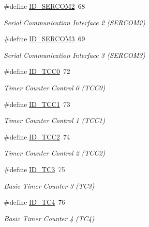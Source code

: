 \begin{DoxyCompactItemize}
\#define \mbox{\hyperlink{group___s_a_m_d21_e15_b__id_ga686cda24424f0437fd3fd9a949c81314}{I\+D\+\_\+\+S\+E\+R\+C\+O\+M2}}~68
\begin{DoxyCompactList}\small\item\em Serial Communication Interface 2 (S\+E\+R\+C\+O\+M2) \end{DoxyCompactList}\item 
\#define \mbox{\hyperlink{group___s_a_m_d21_e15_b__id_ga65935c5552e27662e8a48b0756d23967}{I\+D\+\_\+\+S\+E\+R\+C\+O\+M3}}~69
\begin{DoxyCompactList}\small\item\em Serial Communication Interface 3 (S\+E\+R\+C\+O\+M3) \end{DoxyCompactList}\item 
\#define \mbox{\hyperlink{group___s_a_m_d21_e15_b__id_gae710608f4c53680eb854f146b8cfd395}{I\+D\+\_\+\+T\+C\+C0}}~72
\begin{DoxyCompactList}\small\item\em Timer Counter Control 0 (T\+C\+C0) \end{DoxyCompactList}\item 
\#define \mbox{\hyperlink{group___s_a_m_d21_e15_b__id_ga3a4b71213e54d4a617589bc14d66502f}{I\+D\+\_\+\+T\+C\+C1}}~73
\begin{DoxyCompactList}\small\item\em Timer Counter Control 1 (T\+C\+C1) \end{DoxyCompactList}\item 
\#define \mbox{\hyperlink{group___s_a_m_d21_e15_b__id_ga933f0423071b10a976b58a760fa9c2b2}{I\+D\+\_\+\+T\+C\+C2}}~74
\begin{DoxyCompactList}\small\item\em Timer Counter Control 2 (T\+C\+C2) \end{DoxyCompactList}\item 
\#define \mbox{\hyperlink{group___s_a_m_d21_e15_b__id_gac978ebe37e0ce9dfe2eec2f15ab83015}{I\+D\+\_\+\+T\+C3}}~75
\begin{DoxyCompactList}\small\item\em Basic Timer Counter 3 (T\+C3) \end{DoxyCompactList}\item 
\#define \mbox{\hyperlink{group___s_a_m_d21_e15_b__id_ga59ecaec462139ce30c8ebe1dc25f9f7d}{I\+D\+\_\+\+T\+C4}}~76
\begin{DoxyCompactList}\small\item\em Basic Timer Counter 4 (T\+C4) \end{DoxyCompactList}\item 

\end{DoxyCompactItemize}
